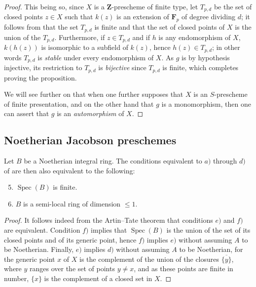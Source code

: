 \begin{proof}
This being so, since $X$ is a $\mathbf{Z}$-prescheme of finite type, let $T_{p,d}$ be the set of closed points $z\in X$ such that $k(z)$ is an extension of $\mathbf{F}_p$ of degree dividing $d$; it follows from  that the set $T_{p,d}$ is finite and that the set of closed points of $X$ is the union of the $T_{p,d}$.
Furthermore, if $z\in T_{p,d}$ and if $h$ is any endomorphism of $X$, $k(h(z))$ is isomorphic to a subfield of $k(z)$, hence $h(z)\in T_{p,d}$; in other words $T_{p,d}$ is \emph{stable} under every endomorphism of $X$.
As $g$ is by hypothesis injective, its restriction to $T_{p,d}$ is \emph{bijective} since $T_{p,d}$ is finite, which completes proving the proposition.

We will see further on  that when one further supposes that $X$ is an $S$-prescheme of finite presentation, and on the other hand that $g$ is a monomorphism, then one can assert that $g$ is an \emph{automorphism} of $X$.
\end{proof}

\subsection{Noetherian Jacobson preschemes}
\label{subsection:IV.10.5}

\begin{proposition}[10.5.1]
\label{IV.10.5.1}
Let $B$ be a Noetherian integral ring.
The conditions equivalent to $a)$ through $d)$ of  are then also equivalent to the following:
\begin{enumerate}[label=\emph{\alph*)}]
  \setcounter{enumi}{4}
  \item $\operatorname{Spec}(B)$ is finite.
  \item $B$ is a semi-local ring of dimension $\leq 1$.
\end{enumerate}
\end{proposition}

\begin{proof}
It follows indeed from the Artin--Tate theorem  that conditions $e)$ and $f)$ are equivalent.
Condition $f)$ implies that $\operatorname{Spec}(B)$ is the union of the set of its closed points and of its generic point, hence $f)$ implies $e)$ without assuming $A$ to be Noetherian.
Finally, $e)$ implies $d)$ without assuming $A$ to be Noetherian, for the generic point $x$ of $X$ is the complement of the union of the closures $\overline{\{y\}}$, where $y$ ranges over the set of points $y\neq x$, and as these points are finite in number, $\{x\}$ is the complement of a closed set in $X$.
\end{proof}

